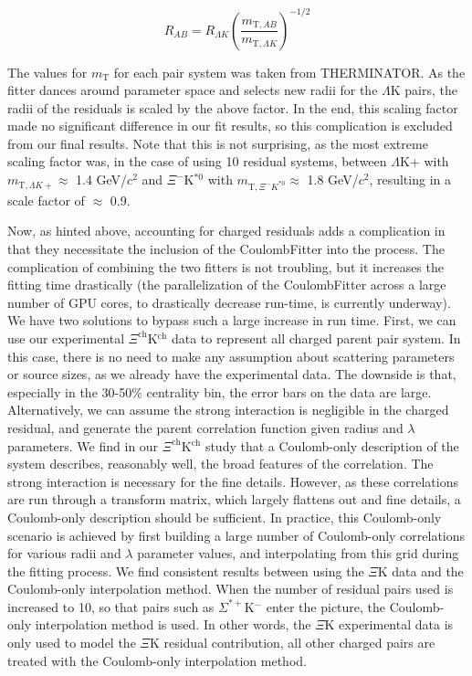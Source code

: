 \documentclass[ALICE,manyauthors]{cernphprep}
\begin{document}
\begin{equation}
R_{AB} = R_{\Lambda K}\left(\frac{m_{\mathrm{T},AB}}{m_{\mathrm{T},\Lambda K}}\right)^{-1/2}
\end{equation}

The values for $m_{\mathrm{T}}$ for each pair system was taken from THERMINATOR.  As the fitter dances around parameter space and selects new radii for the $\Lambda$K pairs, the radii of the residuals is scaled by the above factor.  In the end, this scaling factor made no significant difference in our fit results, so this complication is excluded from our final results.  Note that this is not surprising, as the most extreme scaling factor was, in the case of using 10 residual systems, between $\Lambda$K+ with $m_{\mathrm{T},\Lambda K+} \approx$ 1.4 GeV/$c^{2}$ and $\Xi^{-}$K$^{*0}$ with $m_{\mathrm{T},\Xi^{-} K^{*0}} \approx$ 1.8 GeV/$c^{2}$, resulting in a scale factor of $\approx$ 0.9.

Now, as hinted above, accounting for charged residuals adds a complication in that they necessitate the inclusion of the CoulombFitter into the process.  The complication of combining the two fitters is not troubling, but it increases the fitting time drastically (the parallelization of the CoulombFitter across a large number of GPU cores, to drastically decrease run-time, is currently underway).  We have two solutions to bypass such a large increase in run time.  First, we can use our experimental $\Xi^{\mathrm{ch}}$K$^{\mathrm{ch}}$ data to represent all charged parent pair system.  In this case, there is no need to make any assumption about scattering parameters or source sizes, as we already have the experimental data.  The downside is that, especially in the 30-50\% centrality bin, the error bars on the data are large.  Alternatively, we can assume the strong interaction is negligible in the charged residual, and generate the parent correlation function given radius and $\lambda$ parameters.  We find in our $\Xi^{\mathrm{ch}}$K$^{\mathrm{ch}}$ study that a Coulomb-only description of the system describes, reasonably well, the broad features of the correlation.  The strong interaction is necessary for the fine details.  However, as these correlations are run through a transform matrix, which largely flattens out and fine details, a Coulomb-only description should be sufficient.  In practice, this Coulomb-only scenario is achieved by first building a large number of Coulomb-only correlations for various radii and $\lambda$ parameter values, and interpolating from this grid during the fitting process.  We find consistent results between using the $\Xi$K data and the Coulomb-only interpolation method.  When the number of residual pairs used is increased to 10, so that pairs such as $\Sigma^{*+}$K$^{-}$ enter the picture, the Coulomb-only interpolation method is used.  In other words, the $\Xi$K experimental data is only used to model the $\Xi$K residual contribution, all other charged pairs are treated with the Coulomb-only interpolation method.
\end{document}

